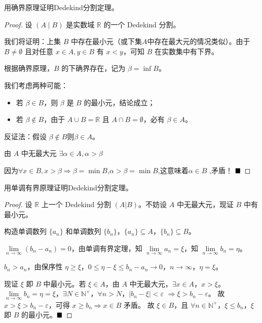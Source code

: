 \begin{problem}
    用确界原理证明Dedekind分割定理。
\end{problem}

\begin{proof}
    设 $(A \mid B)$ 是实数域 $\mathbb{R}$ 的一个 Dedekind 分割。
    
    我们将证明：上集 $B$ 中存在最小元（或下集$A$中存在最大元的情况类似）。由于 $B \ne \emptyset$ 且对任意 $x \in A, y \in B$ 有 $x < y$，可知 $B$ 在实数集中有下界。
    
    根据确界原理，$B$ 的下确界存在，记为 $\beta = \inf B$。
    
    我们考虑两种可能：
    
    \begin{itemize}
    \item 若 $\beta \in B$，则 $\beta$ 是 $B$ 的最小元，结论成立；
    \item 若 $\beta \notin B$，由于 $A \cup B = \mathbb{R}$ 且 $A \cap B = \emptyset$，必有 $\beta \in A$。
    \end{itemize}
    反证法：假设 $\beta \notin B $则$ \beta \in A$。
    
    由 $A$ 中无最大元 $\exists \alpha \in A , \alpha > \beta $

    因为$\forall x \in B , x > \beta \Rightarrow \beta = \min B $,$\alpha > \beta = \min B$,这意味着$\alpha \in B$ ,矛盾！ $ \hfill \blacksquare$
\end{proof}

\begin{problem}\label{problem:dandiao dedekind}
    用单调有界原理证明Dedekind分割定理。
\end{problem}

\begin{proof}
    设 $\mathbb{R}$ 上一个 Dedekind 分割 $(A|B)$。不妨设 $A$ 中无最大元，现证 $B$ 中有最小元。
    
    构造单调数列 $\{a_n\}$ 和单调数列 $\{b_n\}$，$\{a_n\} \subseteq A$，$\{b_n\} \subseteq B$。
    
    $\lim\limits_{n \to \infty} (b_n - a_n) = 0$，由单调有界定理，知 $\lim\limits_{n \to \infty} a_n = \xi$，知 $\lim\limits_{n \to \infty} b_n = \eta$。
    
    $b_n > a_n$，由保序性 $\eta \geq \xi$，$0 \leq \eta - \xi \leq b_n - a_n \to 0$，$n \to \infty$，$\eta = \xi$。
    
    现证 $\xi$ 即 $B$ 中最小元。若 $\xi \in A$，由 $A$ 中无最大元，$\exists x \in A$，$x > \xi$。  
    $\lim\limits_{n \to \infty} b_n = \eta = \xi$，$\exists N \in \mathbb{N}^+$，$\forall n > N$，$|b_n - \xi| < \varepsilon$ $\Rightarrow \xi > b_n - \varepsilon$。
    故$x > \xi > b_n - \varepsilon$，可得 $x \geq b_n \Rightarrow x \in B$ 矛盾。
    故 $\xi \in B$，且 $\forall n \in \mathbb{N}^+$，$\xi \leq b_n$，$\xi$即 $B$ 的最小元。$\hfill \blacksquare$
    \end{proof}
    


